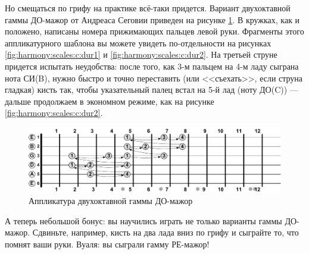 Но смещаться по грифу на практике всё-таки придется. Вариант двухоктавной гаммы ДО-мажор от Андреаса Сеговии приведен на рисунке \ref{fig:harmony:scales:c:dur:segovia}. В кружках, как и положено, написаны номера прижимающих пальцев левой руки. Фрагменты этого аппликатурного шаблона вы можете увидеть по-отдельности на рисунках \ref{fig:harmony:scales:c:dur1} и \ref{fig:harmony:scales:c:dur2}. На третьей струне придется испытать неудобства: после того, как 3-м пальцем на 4-м ладу сыграна нота СИ(B), нужно быстро и точно переставить (или <<съехать>>, если струна гладкая) кисть так, чтобы указательный палец встал на 5-й лад (ноту ДО(C)) --- дальше продолжаем в экономном режиме, как на рисунке \ref{fig:harmony:scales:c:dur2}.

\begin{figure}[!ht]
    \centering
    \includegraphics[width=\textwidth]{fig/intervals/c-dur-csale-segovia} 
    \caption{Аппликатура двухоктавной гаммы ДО-мажор}\label{fig:harmony:scales:c:dur:segovia}
\end{figure} 

А теперь небольшой бонус: вы научились играть не только варианты гаммы ДО-мажор. Сдвиньте, например, кисть на два лада вниз по грифу и сыграйте то, что помнят ваши руки. Вуаля: вы сыграли гамму РЕ-мажор!

